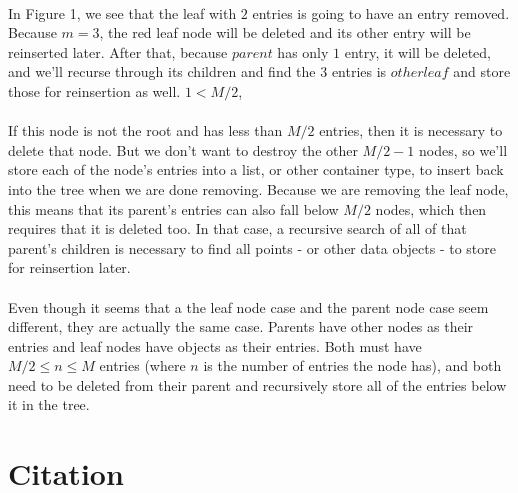 \documentclass{article}
\begin{document}
\paragraph{}
In Figure 1, we see that the leaf with $2$ entries is going to have an entry removed. Because $m=3$, the red leaf node will be deleted
and its other entry will be reinserted later.
After that, because $parent$ has only $1$ entry, it will be deleted, and we'll recurse through its children and find the $3$ entries
is $other leaf$ and store those for reinsertion as well.
$1 < M/2$, 
\paragraph{}
If this node is not the root and has less than $M/2$ entries, then it is necessary to delete that node. But we don't want to destroy
the other $M/2 - 1$ nodes, so we'll store each of the node's entries into a list, or other container type, to insert back into
the tree when we are done removing. Because we are removing the leaf node, this means that its parent's entries can also fall below
$M/2$ nodes, which then requires that it is deleted too. In that case, a recursive search of all of that parent's children is necessary
to find all points - or other data objects - to store for reinsertion later.
\paragraph{}
Even though it seems that a the leaf node case and the parent node case seem different, they are actually the same case. Parents have
other nodes as their entries and leaf nodes have objects as their entries. Both must have $M/2 \le n \le M$ entries (where $n$ is the number
of entries the node has), and both need to be deleted from their parent and recursively store all of the entries below it in the tree.

\section{Citation}


\end{document}
